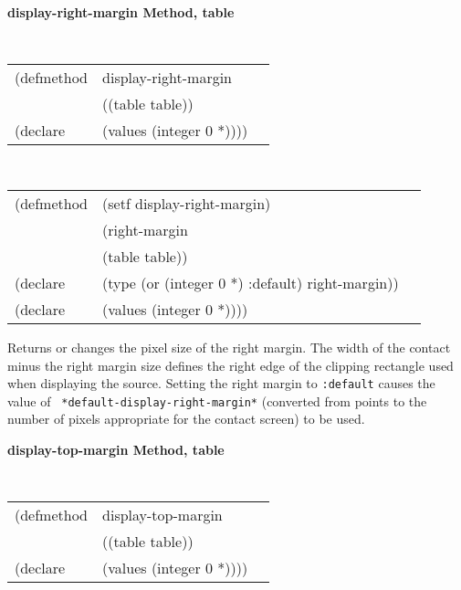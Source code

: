 {\samepage  
{\large {\bf display-right-margin \hfill Method, table}}
\begin{flushright} \parbox[t]{6.125in}{
\tt
\begin{tabular}{lll}
\raggedright
(defmethod & display-right-margin & \\
& ((table  table)) \\
(declare & (values (integer 0 *))))
\end{tabular}
\rm

}\end{flushright}}

\begin{flushright} \parbox[t]{6.125in}{
\tt
\begin{tabular}{lll}
\raggedright
(defmethod & (setf display-right-margin) & \\
         & (right-margin \\
         & (table  table)) \\
(declare &(type (or (integer 0 *) :default)  right-margin))\\
(declare & (values (integer 0 *))))
\end{tabular}
\rm}
\end{flushright}

\begin{flushright} \parbox[t]{6.125in}{
Returns or changes the pixel size of the
right margin.  The width of the contact minus the right margin size defines
the right edge of the clipping rectangle used when displaying the source.
Setting the right margin to {\tt :default} causes the value of {\tt
*default-display-right-margin*} (converted from points to the number of pixels
appropriate for the contact screen) to be used.
}
\end{flushright}


{\samepage  
{\large {\bf display-top-margin \hfill Method, table}}
\begin{flushright} \parbox[t]{6.125in}{
\tt
\begin{tabular}{lll}
\raggedright
(defmethod & display-top-margin & \\
& ((table  table)) \\
(declare & (values (integer 0 *))))
\end{tabular}
\rm

}\end{flushright}}

